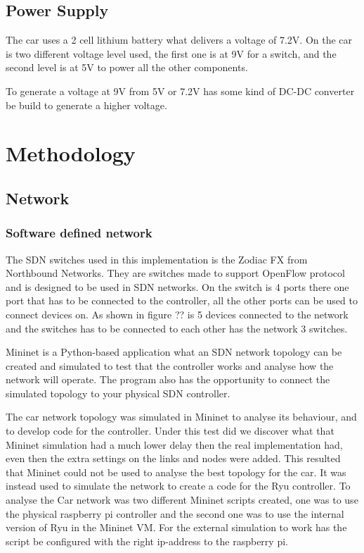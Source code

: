 \documentclass[11pt, titlepage]{article} %
\begin{document}

\subsection{Power Supply}
The car uses a 2 cell lithium battery what delivers a voltage of 7.2V. On the car is two different voltage level used, the first one is at 9V for a switch, and the second level is at 5V to power all the other components. 

To generate a voltage at 9V from 5V or 7.2V has some kind of DC-DC converter be build to generate a higher voltage. 


\clearpage
\section{Methodology}
\subsection{Network}
\subsubsection{Software defined network}

The SDN switches used in this implementation is the Zodiac FX from Northbound Networks. They are switches made to support OpenFlow protocol and is designed to be used in SDN networks. On the switch is 4 ports there one port that has to be connected to the controller, all the other ports can be used to connect devices on. As shown in figure ?? is 5 devices connected to the network and the switches has to be connected to each other has the network 3 switches. 

Mininet is a Python-based application what an SDN network topology can be created and simulated to test that the controller works and analyse how the network will operate. The program also has the opportunity to connect the simulated topology to your physical SDN controller. 

The car network topology was simulated in Mininet to analyse its behaviour, and to develop code for the controller. Under this test did we discover what that Mininet simulation had a much lower delay then the real implementation had, even then the extra settings on the links and nodes were added. This resulted that Mininet could not be used to analyse the best topology for the car. It was instead used to simulate the network to create a code for the Ryu controller. To analyse the Car network was two different Mininet scripts created, one was to use the physical raspberry pi controller and the second one was to use the internal version of Ryu in the Mininet VM. For the external simulation to work has the script be configured with the right ip-address to the raspberry pi. 
\end{document}
